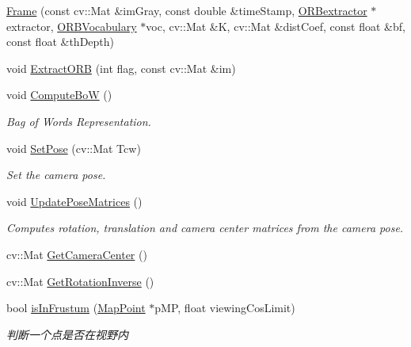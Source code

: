 \begin{DoxyCompactItemize}
\item 
\mbox{\hyperlink{class_o_r_b___s_l_a_m2_1_1_frame_a39a57316938495a9ca8a053edd74b414}{Frame}} (const cv\+::\+Mat \&im\+Gray, const double \&time\+Stamp, \mbox{\hyperlink{class_o_r_b___s_l_a_m2_1_1_o_r_bextractor}{O\+R\+Bextractor}} $\ast$extractor, \mbox{\hyperlink{namespace_o_r_b___s_l_a_m2_a2fafba714858cab1bb18d438e2e83c5d}{O\+R\+B\+Vocabulary}} $\ast$voc, cv\+::\+Mat \&K, cv\+::\+Mat \&dist\+Coef, const float \&bf, const float \&th\+Depth)
\item 
void \mbox{\hyperlink{class_o_r_b___s_l_a_m2_1_1_frame_a626aef981e9fd9caff63bf93f1abf47f}{Extract\+O\+RB}} (int flag, const cv\+::\+Mat \&im)
\item 
void \mbox{\hyperlink{class_o_r_b___s_l_a_m2_1_1_frame_ac748d2318f9a409406dba4910ff5ef8e}{Compute\+BoW}} ()
\begin{DoxyCompactList}\small\item\em Bag of Words Representation. \end{DoxyCompactList}\item 
void \mbox{\hyperlink{class_o_r_b___s_l_a_m2_1_1_frame_a95cf2ea68735ef3e8c2d820eada11bf4}{Set\+Pose}} (cv\+::\+Mat Tcw)
\begin{DoxyCompactList}\small\item\em Set the camera pose. \end{DoxyCompactList}\item 
void \mbox{\hyperlink{class_o_r_b___s_l_a_m2_1_1_frame_a0a18d3024a23f6fa2cab9c7d987598c2}{Update\+Pose\+Matrices}} ()
\begin{DoxyCompactList}\small\item\em Computes rotation, translation and camera center matrices from the camera pose. \end{DoxyCompactList}\item 
cv\+::\+Mat \mbox{\hyperlink{class_o_r_b___s_l_a_m2_1_1_frame_a48c8983df3a521ed7439d9654b28e390}{Get\+Camera\+Center}} ()
\item 
cv\+::\+Mat \mbox{\hyperlink{class_o_r_b___s_l_a_m2_1_1_frame_a96ec2c272f2ecea3f94b8472add80478}{Get\+Rotation\+Inverse}} ()
\item 
bool \mbox{\hyperlink{class_o_r_b___s_l_a_m2_1_1_frame_a0929e100e3380dba1baba12dfa8904c4}{is\+In\+Frustum}} (\mbox{\hyperlink{class_o_r_b___s_l_a_m2_1_1_map_point}{Map\+Point}} $\ast$p\+MP, float viewing\+Cos\+Limit)
\begin{DoxyCompactList}\small\item\em 判断一个点是否在视野内 \end{DoxyCompactList}\item 

\end{DoxyCompactItemize}
